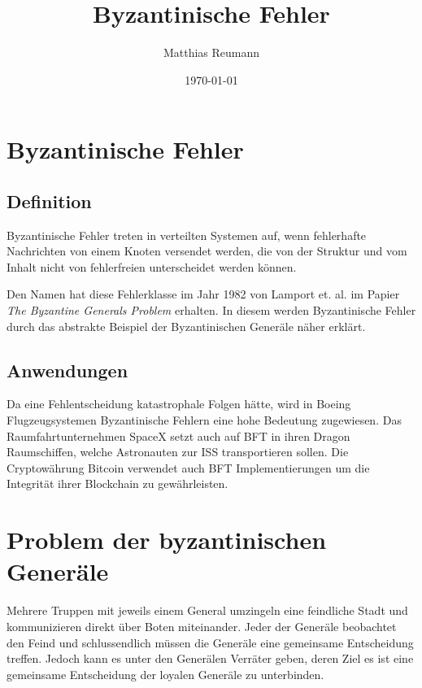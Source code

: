 \documentclass{article}
\title{Byzantinische Fehler}
\author{Matthias Reumann}
\date{\today}
\begin{document}
\maketitle

\newpage

\tableofcontents

\newpage

\section{Byzantinische Fehler}

\subsection{Definition}

Byzantinische Fehler treten in verteilten Systemen auf, 
wenn fehlerhafte Nachrichten von einem Knoten versendet werden, 
die von der Struktur und vom Inhalt nicht von fehlerfreien
unterscheidet werden können. \cite{esraberlin} 

\medskip 

Den Namen hat diese Fehlerklasse im Jahr 1982 von Lamport et. al. im 
Papier \textit{The Byzantine Generals Problem} erhalten.\cite{generals}
In diesem werden Byzantinische Fehler durch das abstrakte Beispiel der Byzantinischen Generäle näher erklärt.

\subsection{Anwendungen}
Da eine Fehlentscheidung katastrophale Folgen hätte, wird in Boeing Flugzeugsystemen 
Byzantinische Fehlern eine hohe Bedeutung zugewiesen.
Das Raumfahrtunternehmen SpaceX setzt auch auf BFT in ihren Dragon Raumschiffen, 
welche Astronauten zur ISS transportieren sollen. 
Die Cryptowährung Bitcoin verwendet auch BFT Implementierungen um die Integrität 
ihrer Blockchain zu gewährleisten. 

\section{Problem der byzantinischen Generäle}
\label{sec:generals}

Mehrere Truppen mit jeweils einem General umzingeln eine feindliche Stadt und 
kommunizieren direkt über Boten miteinander. 
Jeder der Generäle beobachtet den Feind und schlussendlich müssen die Generäle 
eine gemeinsame Entscheidung treffen. Jedoch kann es unter den Generälen Verräter geben,
deren Ziel es ist eine gemeinsame Entscheidung der loyalen Generäle zu unterbinden. 
\end{document}
